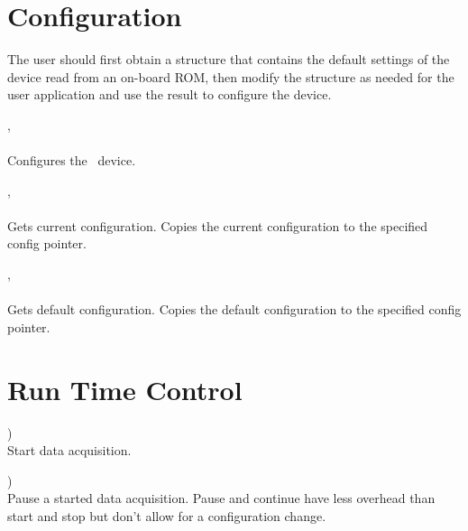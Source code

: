 	
	

	

	\section{Configuration}
		The user should first obtain a structure that contains the default settings of the device read from an on-board ROM, 
		then modify the structure as needed for the user application and use the result to configure the device.\par


		\deviceconfig, \\ \\
		Configures the \deviceName\ device.\par

		\deviceconfig, \\ \\
		Gets current configuration. Copies the current configuration to the specified config pointer.\par

		\deviceconfig, \\ \\
		Gets default configuration. Copies the default configuration to the specified config pointer.\par


	

	\section{Run Time Control}

		\device)\\
		Start data acquisition.\par

		\device)\\
		Pause a started data acquisition. 
		Pause and continue have less overhead than start and stop but don't allow for a configuration change.\par

